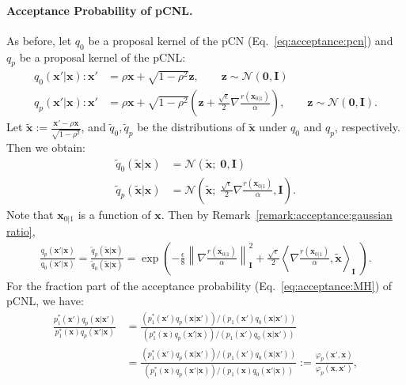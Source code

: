 \paragraph{Acceptance Probability of pCNL.}
As before, let $q_0$ be a proposal kernel of the pCN (Eq.~\ref{eq:acceptance:pcn}) and $q_p$ be a proposal kernel of the pCNL:
\begin{align}
    q_0(\mathbf{x}'|\mathbf{x}) : \mathbf{x}'&=\rho \mathbf{x}+\sqrt{1-\rho^2}\mathbf{z}, \qquad \mathbf{z}\sim \mathcal{N}(\mathbf{0}, \mathbf{I})\\
    q_p(\mathbf{x}'|\mathbf{x}): \mathbf{x}'&=\rho\mathbf{x}+\sqrt{1-\rho^2}\left( \mathbf{z}+\frac{\sqrt{\epsilon}}{2} \nabla \frac{r(\mathbf{x}_{0|1})}{\alpha}\right), \qquad \mathbf{z}\sim \mathcal{N}(\mathbf{0}, \mathbf{I}).
\end{align}
Let $\tilde{\mathbf{x}}:=\frac{\mathbf{x}'-\rho \mathbf{x}}{\sqrt{1-\rho^2}}$, and $\tilde{q}_0, \tilde{q}_p$ be the distributions of $\tilde{\mathbf{x}}$ under $q_0$ and $q_p$, respectively. Then we obtain:
\begin{align}
    \tilde q_0(\tilde{\mathbf{x}}|\mathbf{x})&=\mathcal{N}(\tilde{\mathbf{x}};\; \mathbf{0}, \mathbf{I})\\
    \tilde q_p(\tilde{\mathbf{x}}|\mathbf{x})&=\mathcal{N}(\tilde{\mathbf{x}};\; \frac{\sqrt{\epsilon}}{2} \nabla \frac{r(\mathbf{x}_{0|1})}{\alpha}, \mathbf{I}).
\end{align}
Note that $\mathbf{x}_{0|1}$ is a function of $\mathbf{x}$.
Then by Remark~\ref{remark:acceptance:gaussian ratio},
\begin{align}
    \label{eq:acceptance:pcnl qp/q0}
    \frac{q_p(\mathbf{x}'|\mathbf{x})}{q_0(\mathbf{x}'|\mathbf{x})}=
    \frac{\tilde q_p(\tilde{\mathbf{x}}|\mathbf{x})}{\tilde q_0(\tilde{\mathbf{x}}|\mathbf{x})}=\exp \left( -\frac{\epsilon}{8}\left\| \nabla \frac{r(\mathbf{x}_{0|1})}{\alpha} \right\|^2_\mathbf{I} + \frac{\sqrt{\epsilon}}{2}\left\langle \nabla \frac{r(\mathbf{x}_{0|1})}{\alpha}, \tilde{\mathbf{x}} \right\rangle_{\mathbf{I}}\; \right).
\end{align}
For the fraction part of the acceptance probability (Eq.~\ref{eq:acceptance:MH}) of pCNL, we have:
\begin{align}
    \label{eq:acceptance:pcnl_1}
    \frac{p_1^*(\mathbf{x}')q_p(\mathbf{x}|\mathbf{x}')}{p_1^*(\mathbf{x})q_p(\mathbf{x}'|\mathbf{x})}&=\frac{(p_1^*(\mathbf{x}')q_p(\mathbf{x}|\mathbf{x}')) / (p_1(\mathbf{x}')q_0(\mathbf{x}|\mathbf{x}')) }{(p_1^*(\mathbf{x})q_p(\mathbf{x}'|\mathbf{x})) / ( p_1(\mathbf{x}')q_0(\mathbf{x}|\mathbf{x}'))}\\
    \label{eq:acceptance:pcnl_2}
    &=\frac{(p_1^*(\mathbf{x}')q_p(\mathbf{x}|\mathbf{x}')) / (p_1(\mathbf{x}')q_0(\mathbf{x}|\mathbf{x}')) }{(p_1^*(\mathbf{x})q_p(\mathbf{x}'|\mathbf{x})) / ( p_1(\mathbf{x})q_0(\mathbf{x}'|\mathbf{x}))}:=\frac{\varphi_p(\mathbf{x}',\mathbf{x})}{\varphi_p( \mathbf{x}, \mathbf{x}')},
\end{align}
